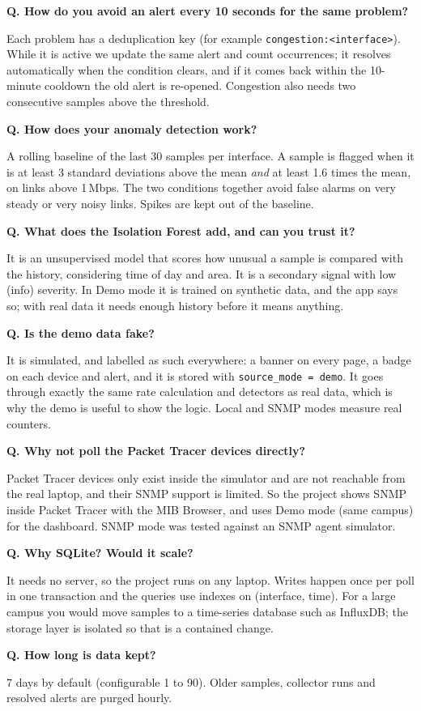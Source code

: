 \documentclass[11pt,a4paper]{article}
\newcommand{\code}[1]{\texttt{#1}}
\newcommand{\qa}[2]{\par\textbf{\sffamily Q. #1}\par\vspace{-2pt}#2\par\vspace{4pt}}
\begin{document}
\qa{How do you avoid an alert every 10 seconds for the same problem?}{Each problem has a deduplication key (for example
\code{congestion:<interface>}). While it is active we update the same alert and count occurrences; it resolves automatically
when the condition clears, and if it comes back within the 10-minute cooldown the old alert is re-opened. Congestion also needs
two consecutive samples above the threshold.}

\qa{How does your anomaly detection work?}{A rolling baseline of the last 30 samples per interface. A sample is flagged when it
is at least 3 standard deviations above the mean \emph{and} at least 1.6 times the mean, on links above 1\,Mbps. The two
conditions together avoid false alarms on very steady or very noisy links. Spikes are kept out of the baseline.}

\qa{What does the Isolation Forest add, and can you trust it?}{It is an unsupervised model that scores how unusual a sample is
compared with the history, considering time of day and area. It is a secondary signal with low (info) severity. In Demo mode it
is trained on synthetic data, and the app says so; with real data it needs enough history before it means anything.}

\qa{Is the demo data fake?}{It is simulated, and labelled as such everywhere: a banner on every page, a badge on each device and
alert, and it is stored with \code{source\_mode = demo}. It goes through exactly the same rate calculation and detectors as real
data, which is why the demo is useful to show the logic. Local and SNMP modes measure real counters.}

\qa{Why not poll the Packet Tracer devices directly?}{Packet Tracer devices only exist inside the simulator and are not reachable
from the real laptop, and their SNMP support is limited. So the project shows SNMP inside Packet Tracer with the MIB Browser,
and uses Demo mode (same campus) for the dashboard. SNMP mode was tested against an SNMP agent simulator.}

\qa{Why SQLite? Would it scale?}{It needs no server, so the project runs on any laptop. Writes happen once per poll in one
transaction and the queries use indexes on (interface, time). For a large campus you would move samples to a time-series
database such as InfluxDB; the storage layer is isolated so that is a contained change.}

\qa{How long is data kept?}{7 days by default (configurable 1 to 90). Older samples, collector runs and resolved alerts are
purged hourly.}
\end{document}
